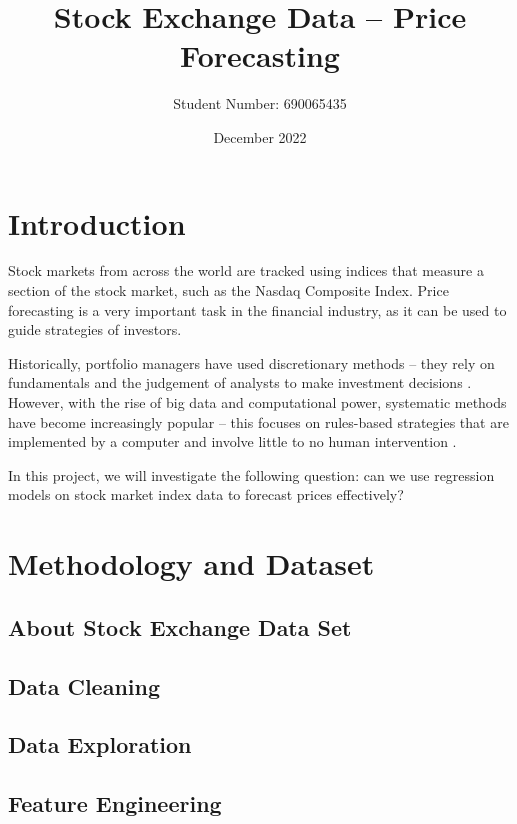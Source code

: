 \documentclass[a4paper, 11pt]{article}
\begin{document}
\title{Stock Exchange Data -- Price Forecasting}
\author{Student Number: 690065435}
\date{December 2022}
\maketitle

\section{Introduction}
Stock markets from across the world are tracked using indices that measure a section of the stock market, such as the Nasdaq Composite Index. Price forecasting is a very important task in the financial industry, as it can be used to guide strategies of investors.

Historically, portfolio managers have used discretionary methods -- they rely on fundamentals and the judgement of analysts to make investment decisions \cite{harvey2017man}. However, with the rise of big data and computational power, systematic methods have become increasingly popular -- this focuses on rules-based strategies that are implemented by a computer and involve little to no human intervention \cite{harvey2017man}. 

In this project, we will investigate the following question: can we use regression models on stock market index data to forecast prices effectively?

\section{Methodology and Dataset}

\subsection{About Stock Exchange Data Set}

\subsection{Data Cleaning}

\subsection{Data Exploration}

\subsection{Feature Engineering}
\end{document}
